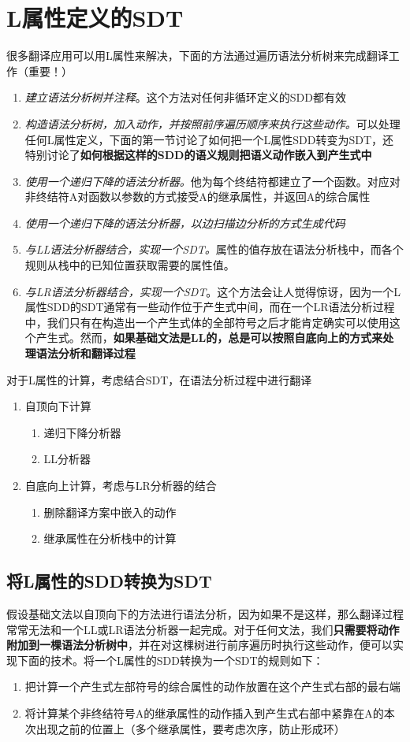 \documentclass[]{report}
\begin{document}
	\section{L属性定义的SDT}
	很多翻译应用可以用L属性来解决，{\color[HTML]{FF0000}下面的方法通过遍历语法分析树来完成翻译工作（重要！）}
	\begin{enumerate}
		\item \textit{建立语法分析树并注释}。这个方法对任何非循环定义的SDD都有效
		\item \textit{构造语法分析树，加入动作，并按照前序遍历顺序来执行这些动作。}可以处理任何L属性定义，下面的第一节讨论了如何把一个L属性SDD转变为SDT，还特别讨论了\textbf{如何根据这样的SDD的语义规则把语义动作嵌入到产生式中}
		\item \textit{使用一个递归下降的语法分析器。}他为每个终结符都建立了一个函数。对应对非终结符A对函数以参数的方式接受A的继承属性，并返回A的综合属性
		\item \textit{使用一个递归下降的语法分析器，以边扫描边分析的方式生成代码}
		\item \textit{与LL语法分析器结合，实现一个SDT。}属性的值存放在语法分析栈中，而各个规则从栈中的已知位置获取需要的属性值。
		\item \textit{与LR语法分析器结合，实现一个SDT}。这个方法会让人觉得惊讶，因为一个L属性SDD的SDT通常有一些动作位于产生式中间，而在一个LR语法分析过程中，我们只有在构造出一个产生式体的全部符号之后才能肯定确实可以使用这个产生式。然而，\textbf{如果基础文法是LL的，总是可以按照自底向上的方式来处理语法分析和翻译过程}
	\end{enumerate}
	对于L属性的计算，考虑结合SDT，在语法分析过程中进行翻译
	\begin{enumerate}
		\item 自顶向下计算
		\begin{enumerate}
			\item 递归下降分析器
			\item LL分析器
		\end{enumerate}
		\item 自底向上计算，考虑与LR分析器的结合
		\begin{enumerate}
			\item 删除翻译方案中嵌入的动作
			\item 继承属性在分析栈中的计算
		\end{enumerate}
	\end{enumerate}
		\subsection{将L属性的SDD转换为SDT}\label{subsection:L_SDD_to_SDT}
		假设基础文法以自顶向下的方法进行语法分析，因为如果不是这样，那么翻译过程常常无法和一个LL或LR语法分析器一起完成。对于任何文法，我们\textbf{只需要将动作附加到一棵语法分析树中}，并在对这棵树进行前序遍历时执行这些动作，便可以实现下面的技术。将一个L属性的SDD转换为一个SDT的规则如下：
		\begin{enumerate}
			\item 把计算一个产生式左部符号的综合属性的动作放置在这个产生式右部的最右端
			\item 将计算某个非终结符号A的继承属性的动作插入到产生式右部中紧靠在A的本次出现之前的位置上（多个继承属性，要考虑次序，防止形成环）
		\end{enumerate}
\end{document}
